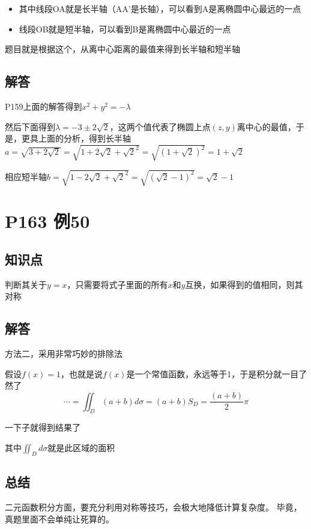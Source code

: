 \documentclass[a4paper]{ctexart}
\begin{document}
\begin{multicols}{2}
\begin{itemize}
    \item 其中线段OA就是长半轴（AA'是长轴），可以看到A是离椭圆中心最远的一点
    \item 线段OB就是短半轴，可以看到B是离椭圆中心最近的一点
\end{itemize}
\par 题目就是根据这个，从离中心距离的最值来得到长半轴和短半轴

\subsection{解答}
\par P159上面的解答得到$x^2 + y^2 = -\lambda$
\par 然后下面得到$\lambda = -3 \pm 2\sqrt{2}$，这两个值代表了椭圆上点$(z,y)$离中心的最值，于是，更具上面的分析，得到长半轴$a = \sqrt{3+2\sqrt{2}} = \sqrt{1 + 2\sqrt{2} + \sqrt{2}^2} = \sqrt{(1+\sqrt{2})^2} = 1+\sqrt{2}$
\par 相应短半轴$b = \sqrt{1 - 2\sqrt{2} + \sqrt{2}^2} = \sqrt{(\sqrt{2} - 1)^2} = \sqrt{2} - 1$

\section{P163 例50}
\subsection{知识点}
\par 判断其关于$y=x$，只需要将式子里面的所有$x$和$y$互换，如果得到的值相同，则其对称

\subsection{解答}
\par 方法二，采用非常巧妙的排除法
\par 假设$f(x)=1$，也就是说$f(x)$是一个常值函数，永远等于1，于是积分就一目了然了
$$
\cdots = \iint_{D}{(a+b)}d\sigma = (a+b)S_D = \frac{(a+b)}{2}\pi
$$
\par 一下子就得到结果了
\par 其中$\iint_{D}d\sigma$就是此区域的面积

\subsection{总结}
\par 二元函数积分方面，要充分利用对称等技巧，会极大地降低计算复杂度。 毕竟，真题里面不会单纯让死算的。











\end{multicols}
\end{document}
